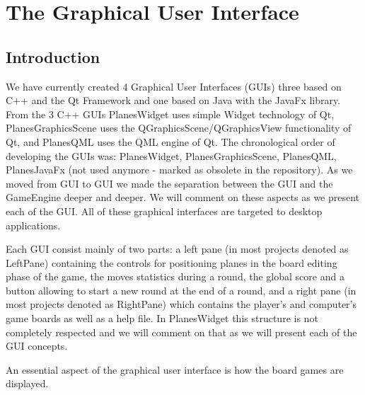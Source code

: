 \documentclass{report}
\begin{document}






\chapter {The Graphical User Interface}

\section{Introduction}

We have currently created 4 Graphical User Interfaces (GUIs) three based on C++ and the Qt Framework and one based on Java with the JavaFx library. From the 3 C++ GUIs PlanesWidget uses simple Widget technology of Qt, PlanesGraphicsScene uses the QGraphicsScene/QGraphicsView functionality of Qt, and PlanesQML uses the QML engine of Qt. The chronological order of developing the GUIs was: PlanesWidget, PlanesGraphicsScene, PlanesQML, PlanesJavaFx (not used anymore - marked as obsolete in the repository). As we moved from GUI to GUI we made the separation between the GUI and the GameEngine deeper and deeper. We will comment on these aspects as we present each of the GUI. All of these graphical interfaces are targeted to desktop applications.

Each GUI consist mainly of two parts: a left pane (in most projects denoted as LeftPane) containing the controls for positioning planes in the board editing phase of the game, the moves statistics during a round, the global score and a button allowing to start a new round at the end of a round, and a right pane (in most projects denoted as RightPane) which contains the player's and computer's game boards as well as a help file. In PlanesWidget this structure is not completely respected and we will comment on that as we will present each of the GUI concepts.

An essential aspect of the graphical user interface is how the board games are displayed. 






\begin{appendices}
	
\end{appendices}
\end{document}

